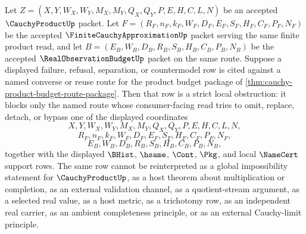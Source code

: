 \begin{corollary}
\label{cor:cauchy-product-budget-route-strict-obstruction}
Let $Z=(X,Y,W_X,W_Y,M_X,M_Y,Q_X,Q_Y,P,E,H,C,L,N)$ be an accepted $\CauchyProductUp$ packet. Let $F=(R_F,n_F,k_F,W_F,D_F,E_F,S_F,H_F,C_F,P_F,N_F)$ be the accepted $\FiniteCauchyApproximationUp$ packet serving the same finite product read, and let $B=(E_B,W_B,D_B,R_B,S_B,H_B,C_B,P_B,N_B)$ be the accepted $\RealObservationBudgetUp$ packet on the same route. Suppose a displayed failure, refusal, separation, or countermodel row is cited against a named converse or reuse route for the product budget package of \autoref{thm:cauchy-product-budget-route-package}. Then that row is a strict local obstruction: it blocks only the named route whose consumer-facing read tries to omit, replace, detach, or bypass one of the displayed coordinates
$$
X,Y,W_X,W_Y,M_X,M_Y,Q_X,Q_Y,P,E,H,C,L,N,
$$
$$
R_F,n_F,k_F,W_F,D_F,E_F,S_F,H_F,C_F,P_F,N_F,
$$
$$
E_B,W_B,D_B,R_B,S_B,H_B,C_B,P_B,N_B,
$$
together with the displayed $\BHist$, $\hsame$, $\Cont$, $\Pkg$, and local $\NameCert$ support rows. The same row cannot be reinterpreted as a global impossibility statement for $\CauchyProductUp$, as a host theorem about multiplication or completion, as an external validation channel, as a quotient-stream argument, as a selected real value, as a host metric, as a trichotomy row, as an independent real carrier, as an ambient completeness principle, or as an external Cauchy-limit principle.
\end{corollary}
